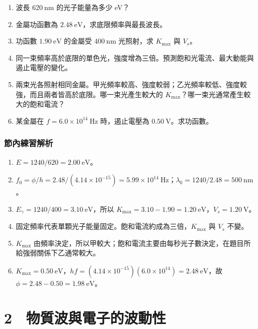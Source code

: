 \documentclass[11pt,a4paper]{article}
\providecommand{\tightlist}{%
  \setlength{\itemsep}{0pt}\setlength{\parskip}{0pt}}
\begin{document}
\begin{enumerate}
\def\labelenumi{\arabic{enumi}.}
\tightlist
\item
  波長 \(620\ \mathrm{nm}\) 的光子能量為多少 eV？
\item
  金屬功函數為 \(2.48\ \mathrm{eV}\)，求底限頻率與最長波長。
\item
  功函數 \(1.90\ \mathrm{eV}\) 的金屬受 \(400\ \mathrm{nm}\) 光照射，求 \(K_{\max}\) 與 \(V_s\)。
\item
  同一束頻率高於底限的單色光，強度增為三倍。預測飽和光電流、最大動能與遏止電壓的變化。
\item
  兩束光各照射相同金屬。甲光頻率較高、強度較弱；乙光頻率較低、強度較強，而且兩者皆高於底限。哪一束光產生較大的 \(K_{\max}\)？哪一束光通常產生較大的飽和電流？
\item
  某金屬在 \(f=6.0\times10^{14}\ \mathrm{Hz}\) 時，遏止電壓為 \(0.50\ \mathrm V\)。求功函數。
\end{enumerate}

\subsubsection{節內練習解析}\label{ux7bc0ux5167ux7df4ux7fd2ux89e3ux6790}

\begin{enumerate}
\def\labelenumi{\arabic{enumi}.}
\tightlist
\item
  \(E=1240/620=2.00\ \mathrm{eV}\)。
\item
  \(f_0=\phi/h=2.48/(4.14\times10^{-15})=5.99\times10^{14}\ \mathrm{Hz}\)；\(\lambda_0=1240/2.48=500\ \mathrm{nm}\)。
\item
  \(E_\gamma=1240/400=3.10\ \mathrm{eV}\)，所以 \(K_{\max}=3.10-1.90=1.20\ \mathrm{eV}\)，\(V_s=1.20\ \mathrm V\)。
\item
  固定頻率代表單顆光子能量固定。飽和電流約成為三倍，\(K_{\max}\) 與 \(V_s\) 不變。
\item
  \(K_{\max}\) 由頻率決定，所以甲較大；飽和電流主要由每秒光子數決定，在題目所給強弱關係下乙通常較大。
\item
  \(K_{\max}=0.50\ \mathrm{eV}\)，\(hf=(4.14\times10^{-15})(6.0\times10^{14})=2.48\ \mathrm{eV}\)，故 \(\phi=2.48-0.50=1.98\ \mathrm{eV}\)。
\end{enumerate}

\section{2　物質波與電子的波動性}\label{ux7269ux8ceaux6ce2ux8207ux96fbux5b50ux7684ux6ce2ux52d5ux6027}
\end{document}
